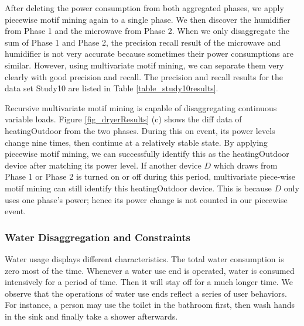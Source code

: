 After deleting the power consumption from both aggregated phases, 
we apply piecewise motif mining again to a single phase. 
We then discover the humidifier from Phase 1 
and the microwave from Phase 2. 
When we only disaggregate the sum of Phase 1 and Phase 2, 
the precision recall result of the microwave and humidifier is not very accurate 
because sometimes their power consumptions are similar. 
However, using multivariate motif mining, we can separate them very clearly 
with good precision and recall. 
The precision and recall results for the data set Study10 are listed in Table \ref{table_study10results}.

Recursive multivariate motif mining is capable of disaggregating continuous variable loads. 
%
Figure \ref{fig_dryerResults} (c) shows the diff data of heatingOutdoor from the two phases. 
During this on event, its power levels change nine times, then continue at a relatively stable state.
By applying piecewise motif mining, 
we can successfully identify this as the heatingOutdoor device 
after matching its power level. 
If another device  $D$ which draws from Phase 1 or Phase 2 is turned on or off during this period, 
multivariate piece-wise motif mining can still identify this heatingOutdoor device. 
This is because $D$ only uses one phase's power; 
hence its power change is not counted in our piecewise event. 

\iffalse
\subsubsection{Water Disaggregation and Constraints}
Water usage displays different characteristics. 
The total water consumption is zero most of the time.
Whenever a water use end is operated, water is consumed intensively for a period of time. 
Then it will stay off for a much longer time. 
We observe that the operations of water use ends reflect a series of user behaviors. 
For instance, a person may use the toilet in the bathroom first, 
then wash hands in the sink and finally take a shower afterwards. 

